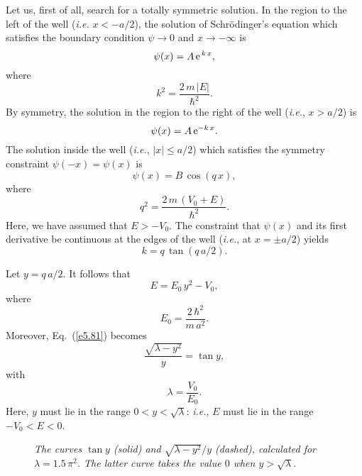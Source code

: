Let us, first of all, search for a totally symmetric solution.
In the region to the left of the well ({\em i.e.} $x<-a/2$), the
solution of Schr\"{o}dinger's equation which satisfies the
boundary condition $\psi\rightarrow 0$ and $x\rightarrow-\infty$ is
\begin{equation}
\psi(x) = A\,{\rm e}^{\,k\,x},
\end{equation}
where
\begin{equation}
k^2 = \frac{2\,m\,|E|}{\hbar^2}.
\end{equation}
By symmetry, the solution in the region to the right of the well ({\em i.e.},
$x>a/2$) is
\begin{equation}
\psi(x) = A\,{\rm e}^{-k\,x}.
\end{equation}
The solution inside the well ({\em i.e.}, $|x|\leq a/2$) which
satisfies the symmetry constraint $\psi(-x)=\psi(x)$ is
\begin{equation}
\psi(x) = B\,\cos(q\,x),
\end{equation}
where
\begin{equation}
q^2 = \frac{2\,m\,(V_0+E)}{\hbar^2}.
\end{equation}
Here, we have assumed that $E> -V_0$. 
The constraint that $\psi(x)$ and its first derivative be continuous at the
edges of the well ({\em i.e.}, at $x=\pm a/2$) yields
\begin{equation}\label{e5.81}
k = q\,\tan(q\,a/2).
\end{equation}

Let $y= q\,a/2$. It follows that
\begin{equation}
E = E_0\,y^2 - V_0,
\end{equation}
where
\begin{equation}
E_0 = \frac{2\,\hbar^2}{m\,a^2}.
\end{equation}
Moreover, Eq.~(\ref{e5.81}) becomes
\begin{equation}\label{e5.84}
\frac{\sqrt{\lambda-y^2}}{y} = \tan y,
\end{equation}
with
\begin{equation}
\lambda = \frac{V_0}{E_0}.
\end{equation}
Here, $y$ must lie in the range $0< y< \sqrt{\lambda}$: {\em i.e.},
$E$ must lie in the range $-V_0< E < 0$.

\begin{figure}
\epsfysize=3in
\centerline{}
\caption{\em The curves $\tan y$ (solid) and $\sqrt{\lambda - y^2}/y$ (dashed), calculated for $\lambda = 1.5\,\pi^2$. The latter curve takes the
value $0$ when $y>\sqrt{\lambda}$. }\label{well}   
\end{figure}

